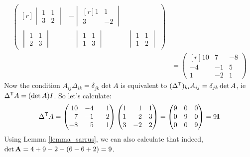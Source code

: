 \documentclass[fleqn,a4paper,11pt]{article}
\begin{document}
\begin{enumerate}[label=\textbf{\arabic*.}]
\begin{align*}
\begin{pmatrix*}[r]
     \begin{vmatrix}
      1 & 1 \\
      3 & 2
     \end{vmatrix} &
     -\begin{vmatrix*}[r]
      1 & 1 \\
      3 & -2
     \end{vmatrix*} \\[3ex]
     \begin{vmatrix}
      1 & 1 \\
      2 & 3
     \end{vmatrix} &
     -\begin{vmatrix}
      1 & 1 \\
      1 & 3
     \end{vmatrix} &
     \begin{vmatrix}
      1 & 1 \\
      1 & 2
     \end{vmatrix}
    \end{pmatrix*} \\
    &= \begin{pmatrix*}[r]
     10 & 7 & -8 \\
     -4 & -1 & 5 \\
     1 & -2 & 1
    \end{pmatrix*}
   \end{align*}
   Now the condition \(A_{ij} \Delta_{ik} = \delta_{jk} \det A\) is equivalent
   to \((\Delta^{\mathsf T})_{ki} A_{ij} = \delta_{jk} \det A\), ie
   \(\Delta^{\mathsf T} A = (\det A)I\). So let's calculate:
   \begin{equation*}
    \tran \Delta A =
    \begin{pmatrix*}[r]
     10 & -4 & 1 \\
     7 & -1 & -2 \\
     -8 & 5 & 1
    \end{pmatrix*}
    \begin{pmatrix*}[r]
     1 & 1 & 1 \\
     1 & 2 & 3 \\
     3 & -2 & 2
    \end{pmatrix*}
    = \begin{pmatrix}
     9 & 0 & 0 \\
     0 & 9 & 0 \\
     0 & 0 & 9
    \end{pmatrix}
    = 9\mat I
   \end{equation*}
   Using Lemma \ref{lemma_sarrus}, we can also calculate that indeed,
   \(\det \mathbf{A} = 4 + 9 - 2 - (6 - 6 + 2) = 9\).


\end{enumerate}
\end{document}
